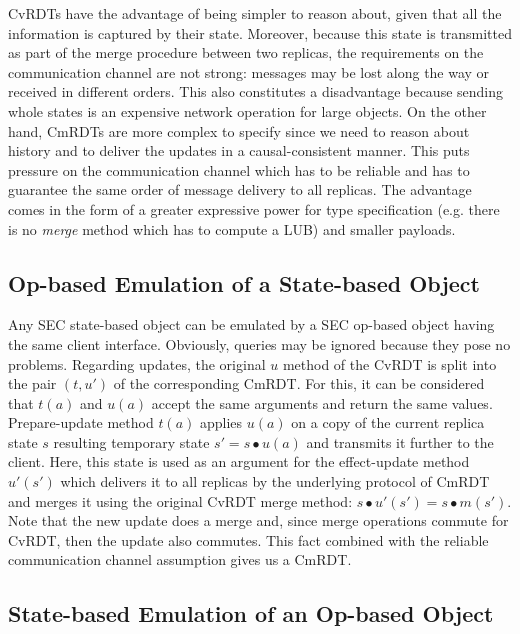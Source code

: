 CvRDTs have the advantage of being simpler to reason about, given that all the
information is captured by their state. Moreover, because this state is
transmitted as part of the merge procedure between two replicas, the
requirements on the communication channel are not strong: messages may be lost
along the way or received in different orders. This also constitutes a
disadvantage because sending whole states is an expensive network operation for
large objects. On the other hand, CmRDTs are more complex to specify since we
need to reason about history and to deliver the updates in a causal-consistent
manner. This puts pressure on the communication channel which has to be reliable
and has to guarantee the same order of message delivery to all replicas. The
advantage comes in the form of a greater expressive power for type specification
(e.g. there is no \textit{merge} method which has to compute a LUB) and smaller
payloads.

\subsection{Op-based Emulation of a State-based Object}
\label{sec:op-based_emulation_of_a_state-based_object}

Any SEC state-based object can be emulated by a SEC op-based object having the
same client interface. Obviously, queries may be ignored because they pose no
problems. Regarding updates, the original $u$ method of the CvRDT is split into
the pair $(t, u')$ of the corresponding CmRDT. For this, it can be considered
that $t(a)$ and $u(a)$ accept the same arguments and return the same values.
Prepare-update method $t(a)$ applies $u(a)$ on a copy of the current replica
state $s$ resulting temporary state $s' = s \bullet u(a)$ and transmits it
further to the client. Here, this state is used as an argument for the
effect-update method $u'(s')$ which delivers it to all replicas by the
underlying protocol of CmRDT and merges it using the original CvRDT merge
method: $s \bullet u'(s') = s \bullet m(s')$. Note that the new update does a
merge and, since merge operations commute for CvRDT, then the update also
commutes. This fact combined with the reliable communication channel assumption
gives us a CmRDT.

\subsection{State-based Emulation of an Op-based Object}
\label{sec:state-based_emulation_of_an_op-based_object}

